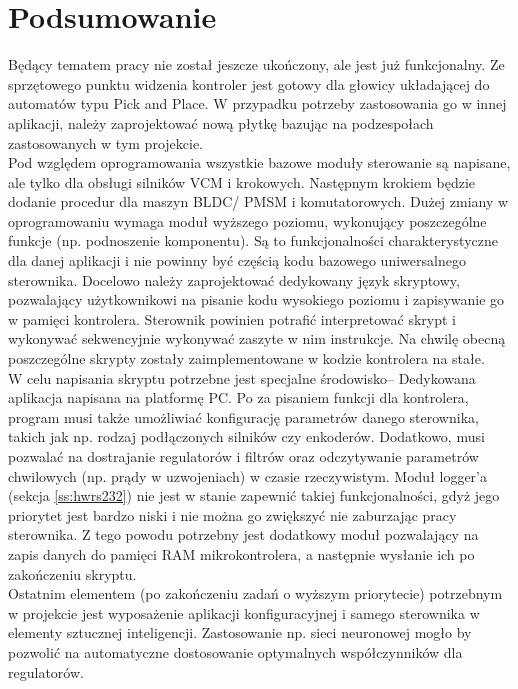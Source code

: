 \section*{Podsumowanie}

Będący tematem pracy \paperTitleSmallPl{} nie został jeszcze ukończony, ale jest już funkcjonalny. Ze sprzętowego punktu widzenia kontroler jest gotowy dla głowicy układającej do automatów typu Pick and Place. W przypadku potrzeby zastosowania go w innej aplikacji, należy zaprojektować nową płytkę bazując na podzespołach zastosowanych w tym projekcie. \\

Pod względem oprogramowania wszystkie bazowe moduły sterowanie są napisane, ale tylko dla obsługi silników VCM i krokowych. Następnym krokiem będzie dodanie procedur dla maszyn BLDC/ PMSM i komutatorowych. Dużej zmiany w oprogramowaniu wymaga moduł wyższego poziomu, wykonujący poszczególne funkcje (np. podnoszenie komponentu). Są to funkcjonalności charakterystyczne dla danej aplikacji i nie powinny być częścią kodu bazowego uniwersalnego sterownika. Docelowo należy zaprojektować dedykowany język skryptowy, pozwalający użytkownikowi na pisanie kodu wysokiego poziomu i zapisywanie go w pamięci kontrolera. Sterownik powinien potrafić interpretować skrypt i wykonywać sekwencyjnie wykonywać zaszyte w nim instrukcje. Na chwilę obecną poszczególne skrypty zostały zaimplementowane w kodzie kontrolera na stałe. \\

W celu napisania skryptu potrzebne jest specjalne środowisko-- Dedykowana aplikacja napisana na platformę PC. Po za pisaniem funkcji dla kontrolera, program musi także umożliwiać konfigurację parametrów danego sterownika, takich jak np. rodzaj podłączonych silników czy enkoderów. Dodatkowo, musi pozwalać na dostrajanie regulatorów i filtrów oraz odczytywanie parametrów chwilowych (np. prądy w uzwojeniach) w czasie rzeczywistym. Moduł logger'a (sekcja \ref{ss:hwrs232}) nie jest w stanie zapewnić takiej funkcjonalności, gdyż jego priorytet jest bardzo niski i nie można go zwiększyć nie zaburzając pracy sterownika. Z tego powodu potrzebny jest dodatkowy moduł pozwalający na zapis danych do pamięci RAM mikrokontrolera, a następnie wysłanie ich po zakończeniu skryptu. \\

Ostatnim elementem (po zakończeniu zadań o wyższym priorytecie) potrzebnym w projekcie jest wyposażenie aplikacji konfiguracyjnej i samego sterownika w elementy sztucznej inteligencji. Zastosowanie np. sieci neuronowej mogło by pozwolić na automatyczne dostosowanie optymalnych współczynników dla regulatorów.








